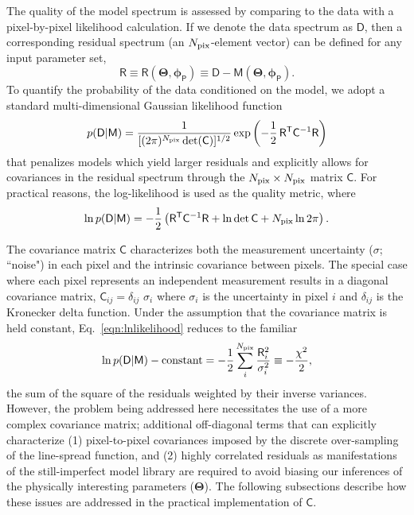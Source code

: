 \documentclass[iop,floatfix,numberedappendix,twocolappendix]{emulateapj}
\newcommand{\vM}{\mathsf{M}}
\newcommand{\vD}{\mathsf{D}}
\newcommand{\vR}{\mathsf{R}}
\newcommand{\vC}{\mathsf{C}}
\newcommand{\trans}{\mathsf{T}}
\newcommand{\vT}{ {\bm \Theta}}
\newcommand{\vp}{ {\bm \phi}}
\newcommand{\cheb}{ \vp_{\mathsf{P}}}
\begin{document}
The quality of the model spectrum is assessed by comparing to the data with a pixel-by-pixel 
likelihood calculation.  If we denote the data spectrum as $\vD$, then a corresponding residual 
spectrum (an $N_{\rm pix}$-element vector) can be defined for any input parameter set,
\begin{equation}
\vR \equiv \vR(\vT, \cheb) \equiv \vD-\vM(\vT, \cheb).
\end{equation}
To quantify the probability of the data conditioned on the model, we adopt a standard 
multi-dimensional Gaussian likelihood function
\begin{equation}
p(\vD|\vM) =  \frac{1}{[(2 \pi)^{N_{\rm pix}} \det(\vC)]^{1/2}} \exp\left ( -\frac{1}{2} \,
   \vR^\trans \vC^{-1} \vR \right )
   \label{eqn:likelihood}
\end{equation}
that penalizes models which yield larger residuals and explicitly allows for covariances in the 
residual spectrum through the $N_{\rm pix} \times N_{\rm pix}$ matrix $\vC$.  For practical 
reasons, the log-likelihood is used as the quality metric, where
\begin{equation}
  \ln{p(\vD | \vM)} = -\frac{1}{2} \left( \vR^\trans \vC^{-1} \vR + \ln{\det{\vC}} + N_{\rm pix} \ln{2\pi} \right).
  \label{eqn:lnlikelihood}
\end{equation}

The covariance matrix $\vC$ characterizes both the measurement uncertainty ($\sigma$; ``noise") in 
each pixel and the intrinsic covariance between pixels.  The special case where each pixel 
represents an independent measurement results in a diagonal covariance matrix, $\vC_{ij} = 
\delta_{ij} \,\, \sigma_i$ where $\sigma_i$ is the uncertainty in pixel $i$ and $\delta_{ij}$ is 
the Kronecker delta function. Under the assumption that the covariance matrix is held constant, Eq.~\ref{eqn:lnlikelihood} reduces to the familiar
\begin{equation}
  \ln{p(\vD | \vM)} - \textrm{constant} = -\frac{1}{2} \sum_i^{N_{\rm pix}} \frac{\vR_i^2}{\sigma_i^2} \equiv -\frac{\chi^2}{2},
\label{eqn:chisq}
\end{equation}
the sum of the square of the residuals weighted by their inverse variances.  However, the problem 
being addressed here necessitates the use of a more complex covariance matrix; additional 
off-diagonal terms that can explicitly characterize (1) pixel-to-pixel covariances imposed by the 
discrete over-sampling of the line-spread function, and (2) highly correlated residuals as 
manifestations of the still-imperfect model library are required to avoid biasing our inferences of 
the physically interesting parameters ($\vT$).  The following subsections describe how these issues 
are addressed in the practical implementation of $\vC$.  
\end{document}
